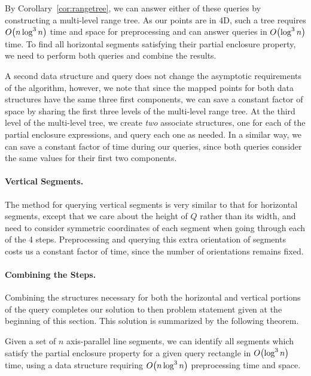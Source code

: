 By Corollary~\ref{cor:rangetree}, we can answer either of these queries by constructing a multi-level range tree.
As our points are in 4D, such a tree requires $O\!\left(n \log^3{n}\right)$ time and space for preprocessing and can answer queries in $O\!\left(\log^3{n}\right)$ time.
To find all horizontal segments satisfying their partial enclosure property, we need to perform both queries and combine the results.  

A second data structure and query does not change the asymptotic requirements of the algorithm, however, we note that since the mapped points for both data structures have the same three first components, we can save a constant factor of space by sharing the first three levels of the multi-level range tree. 
At the third level of the multi-level tree, we create \emph{two} associate structures, one for each of the partial enclosure expressions, and query each one as needed. 
In a similar way, we can save a constant factor of time during our queries, since both queries consider the same values for their first two components.


\paragraph{Vertical Segments.} The method for querying vertical segments is very similar to that for horizontal segments, except that we care about the height of $Q$ rather than its width, and need to consider symmetric coordinates of each segment when going through each of the 4 steps.
Preprocessing and querying this extra orientation of segments costs us a constant factor of time, since the number of orientations remains fixed.


\paragraph{Combining the Steps.} Combining the structures necessary for both the horizontal and vertical portions of the query completes our solution to then problem statement given at the beginning of this section.
This solution is summarized by the following theorem.

\begin{theorem}
\label{th:ap}
Given a set of $n$ axis-parallel line segments, we can identify all segments which satisfy the partial enclosure property for a given query rectangle in $O\!\left(\log^3{n}\right)$ time, using a data structure requiring $O\!\left(n\log^3{n}\right)$ preprocessing time and space.
\end{theorem}

